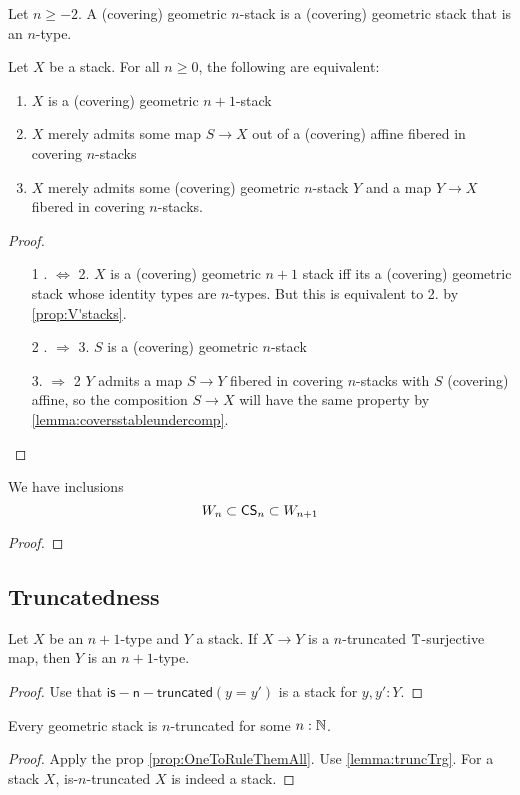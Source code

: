 \begin{definition}
	Let $n \ge -2$. A (covering) geometric $n$-stack is a (covering) geometric stack that is an $n$-type.
\end{definition}
\begin{prop}{\label{prop:nstack}}
	Let $X$ be a stack. For all $n \ge 0$, the following are equivalent:
	\begin{enumerate}
		\item $X$ is a (covering) geometric $n+1$-stack
		\item $X$ merely admits some map $S \to X$ out of a (covering) affine fibered in covering $n$-stacks
		\item $X$ merely admits some (covering) geometric $n$-stack $Y$ and a map $Y \to X$ fibered in covering $n$-stacks.
	\end{enumerate}
\end{prop}
\begin{proof}
	\
	\begin{enumerate}
		\item[1 . $\Leftrightarrow$ 2.]
		$X$ is a (covering) geometric $n+1$ stack iff its a (covering) geometric stack whose identity types are $n$-types. But this is equivalent to 2. by \ref{prop:V'stacks}.
		\item[2 . $\Rightarrow$ 3.]
		$S$ is a (covering) geometric $n$-stack
		\item [3. $\Rightarrow$ 2]
		$Y$ admits a map $S \to Y$  fibered in covering $n$-stacks with $S$ (covering) affine, so the composition $S \to X$ will have the same property by \ref{lemma:coversstableundercomp}.
	\end{enumerate}
\end{proof}
\begin{prop}
	We have inclusions 
	\[W_n \subset \mathsf{CS}_{n} \subset W_{n+1}\]
\end{prop}
\begin{proof}
	
\end{proof}

\subsection{Truncatedness}
\begin{lemma}{\label{lemma:truncTrg}}
	Let $X$ be an $n+1$-type and $Y$ a stack. If $X \to Y$ is a $n$-truncated $\mathbb{T}$-surjective map, then $Y$ is an $n+1$-type.
\end{lemma}
\begin{proof}
	Use that $\mathsf{is-n-truncated} (y=y')$ is a stack for $y , y' : Y.$
\end{proof}

\begin{corollary}
	Every geometric stack is $n$-truncated for some $n : \mathbb{N}$.
\end{corollary}
\begin{proof}
	Apply the prop \ref{prop:OneToRuleThemAll}. Use \ref{lemma:truncTrg}. For a stack $X$, is-$n$-truncated $X$ is indeed a stack.
\end{proof}

